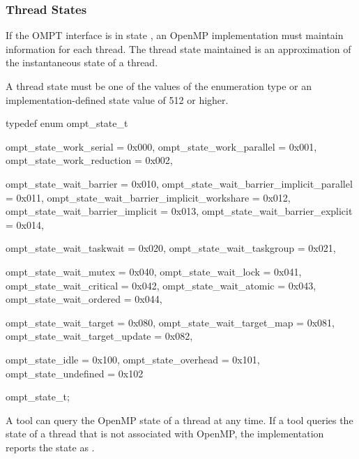 \subsubsection{Thread States}
\label{sec:thread-states}
\label{sec:ompt_state_t}
\summary
If the OMPT interface is in state , an OpenMP implementation
must maintain  information for each thread.
The thread state maintained is an approximation of the instantaneous
state of a thread.

\format
\begin{ccppspecific}
A thread state must be one of the values of the
enumeration type  or
an implementation-defined state value of 512 or higher.

\begin{ompcEnum}
typedef enum ompt_state_t {
  ompt_state_work_serial                      = 0x000,
  ompt_state_work_parallel                    = 0x001,
  ompt_state_work_reduction                   = 0x002,

  ompt_state_wait_barrier                     = 0x010,
  ompt_state_wait_barrier_implicit_parallel   = 0x011,
  ompt_state_wait_barrier_implicit_workshare  = 0x012,
  ompt_state_wait_barrier_implicit            = 0x013,
  ompt_state_wait_barrier_explicit            = 0x014,

  ompt_state_wait_taskwait                    = 0x020,
  ompt_state_wait_taskgroup                   = 0x021,

  ompt_state_wait_mutex                       = 0x040,
  ompt_state_wait_lock                        = 0x041,
  ompt_state_wait_critical                    = 0x042,
  ompt_state_wait_atomic                      = 0x043,
  ompt_state_wait_ordered                     = 0x044,

  ompt_state_wait_target                      = 0x080,
  ompt_state_wait_target_map                  = 0x081,
  ompt_state_wait_target_update               = 0x082,

  ompt_state_idle                             = 0x100,
  ompt_state_overhead                         = 0x101,
  ompt_state_undefined                        = 0x102
} ompt_state_t;
\end{ompcEnum}
\end{ccppspecific}

\descr

A tool can query the OpenMP state of a thread at any time.
If a tool queries the state of a thread that is not associated
with OpenMP, the implementation reports the state as .


